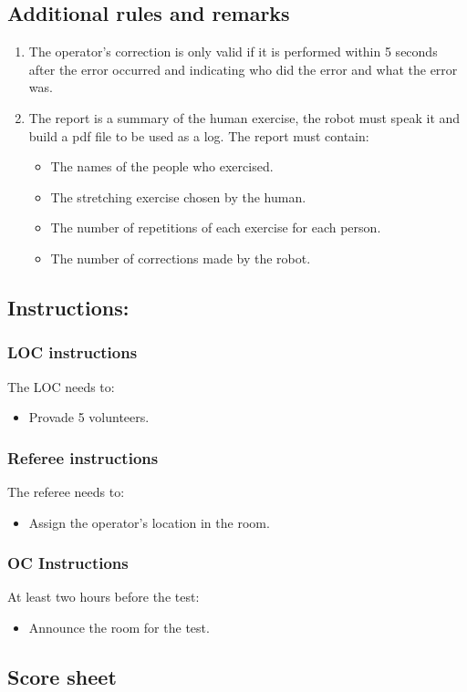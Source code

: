 \subsection*{Additional rules and remarks}
\begin{enumerate}[nosep]
	\item The operator's correction is only valid if it is performed within 5 seconds after the error occurred and indicating who did the error and what the error was.
	\item The report is a summary of the human exercise, the robot must speak it and build a pdf file to be used as a log. The report must contain:
	\begin{itemize}[nosep]
		\item The names of the people who exercised.
		\item The stretching exercise chosen by the human.
		\item The number of repetitions of each exercise for each person.
		\item The number of corrections made by the robot.
	\end{itemize}
\end{enumerate}

\subsection*{Instructions:}

\subsubsection*{LOC instructions}
The LOC needs to:
\begin{itemize}[nosep]
	\item Provade 5 volunteers.
\end{itemize}

\subsubsection*{Referee instructions}
The referee needs to:
\begin{itemize}[nosep]
	\item Assign the operator's location in the room.
\end{itemize}

\subsubsection*{OC Instructions}
At least two hours before the test:
\begin{itemize}[nosep]
	\item Announce the room for the test.
\end{itemize}

\subsection*{Score sheet}

